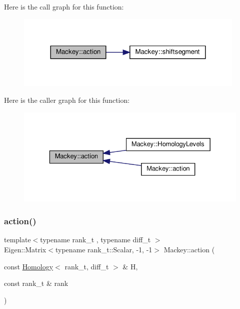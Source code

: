 Here is the call graph for this function\+:\nopagebreak
\begin{figure}[H]
\begin{center}
\leavevmode
\includegraphics[width=312pt]{namespaceMackey_aa515b26c0fbc7f19b36cee7d826f07b9_cgraph}
\end{center}
\end{figure}
Here is the caller graph for this function\+:\nopagebreak
\begin{figure}[H]
\begin{center}
\leavevmode
\includegraphics[width=329pt]{namespaceMackey_aa515b26c0fbc7f19b36cee7d826f07b9_icgraph}
\end{center}
\end{figure}
\mbox{\label{namespaceMackey_a2169692139cf46ac28719780e2a7f867}} 
\subsubsection{\texorpdfstring{action()}{action()}\hspace{0.1cm}{\footnotesize\ttfamily [2/2]}}
{\footnotesize\ttfamily template$<$typename rank\+\_\+t , typename diff\+\_\+t $>$ \\
Eigen\+::\+Matrix$<$typename rank\+\_\+t\+::\+Scalar, -\/1, -\/1$>$ Mackey\+::action (\begin{DoxyParamCaption}\item[{const \hyperlink{classMackey_1_1Homology}{Homology}$<$ rank\+\_\+t, diff\+\_\+t $>$ \&}]{H,  }\item[{const rank\+\_\+t \&}]{rank }\end{DoxyParamCaption})}



